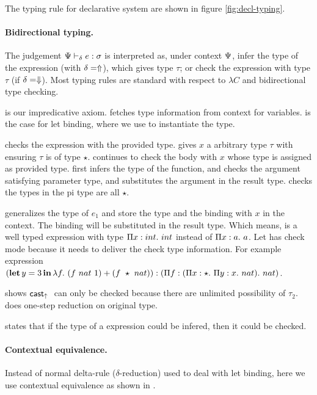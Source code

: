 The typing rule for declarative system are shown in figure \ref{fig:decl-typing}.

\paragraph{Bidirectional typing.} The judgement $\dpreall e:\sigma \trto t$ is interpreted as, under context $\dctx$, infer the type of the expression (with $\delta=\Inf$), which gives type $\tau$; or check the expression with type $\tau$ (if $\delta = \Chk$). Most typing rules are standard with respect to $\lambda C$ and bidirectional type checking.

 is our impredicative axiom.  fetches type information from context for variables.  is the case for let binding, where we use  to instantiate the type.

 checks the expression with the provided type.  gives $x$ a arbitrary type $\tau$ with ensuring $\tau$ is of type $\star$.  continues to check the body with $x$ whose type is assigned as provided type.  first infers the type of the function, and checks the argument satisfying parameter type, and substitutes the argument in the result type.  checks the types in the pi type are all $\star$.

 generalizes the type of $e_1$ and store the type and the binding with $x$ in the context. The binding will be substituted in the result type. Which means,  is a well typed expression with type $\bpi x {int} {int}$ instead of $\bpi x a a $. Let has check mode because it needs to deliver the check type information. For example expression $(\kw{let} y = 3 \kw{in} \erlam f {(f~nat~1) + (f~\star~nat))}: (\bpi f {(\bpi x \star {\bpi y x nat})} nat)$.


 shows $\ercastup$ can only be checked because there are unlimited possibility of $\tau_2$.  does one-step reduction on original type.

 states that if the type of a expression could be infered, then it could be checked.

\paragraph{Contextual equivalence.} Instead of normal delta-rule ($\delta$-reduction) used to deal with let binding, here we use contextual equivalence as shown in .


